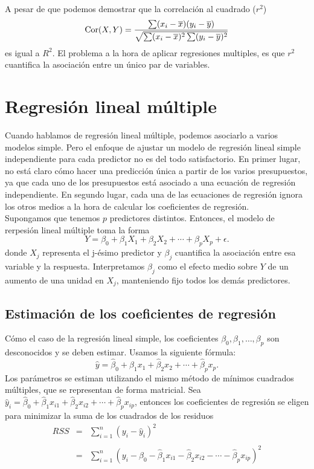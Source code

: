 A pesar de que podemos demostrar que la correlación al cuadrado ($r^2$) 
$$\mathop{\mbox{\normalfont Cor}}\nolimits(X,Y)=\dfrac{\sum(x_i-\overline{x})(y_i-\overline{y})}{\sqrt{\sum(x_i-\overline{x})^2\sum(y_i-\overline{y})^2}}$$
es igual a $R^2$. El problema a la hora de aplicar regresiones multiples, es que $r^2$ cuantifica la asociación entre un único par de variables.


\section{Regresión lineal múltiple}
Cuando hablamos de regresión lineal múltiple, podemos asociarlo a varios modelos simple. Pero el enfoque de ajustar un modelo de regresión lineal simple independiente para cada predictor no es del todo satisfactorio. En primer lugar, no está claro cómo hacer una predicción única a partir de los varios presupuestos, ya que cada uno de los presupuestos está asociado a una ecuación de regresión independiente. En segundo lugar, cada una de las ecuaciones de regresión ignora los otros medios a la hora de calcular los coeficientes de regresión.\\

Supongamos que tenemos $p$ predictores distintos. Entonces, el modelo de rerpesión lineal múltiple toma la forma
$$Y=\beta_0+\beta_1X_1+\beta_2X_2+\cdots+\beta_pX_p+\epsilon.$$
donde $X_j$ representa el j-ésimo predictor y $\beta_j$ cuantifica la asociación entre esa variable y la respuesta. Interpretamos $\beta_j$ como el efecto medio sobre $Y$ de  un aumento de una unidad en $X_j$, manteniendo fijo todos los demás predictores. 

\subsection{Estimación de los coeficientes de regresión}
Cómo el caso de la regresión lineal simple, los coeficientes $\beta_0,\beta_1,\ldots,\beta_p$ son desconocidos y se deben estimar. Usamos la siguiente fórmula: 
$$\hat{y}=\hat{\beta}_0+\hat{\beta}_1x_1+\hat{\beta}_2x_2+\cdots+\hat{\beta}_px_p.$$
Los parámetros se estiman utilizando el mismo método de mínimos cuadrados múltiples, que se representan de forma matricial. Sea $\hat{y}_i=\hat{\beta}_0+\hat{\beta}_1x_{i1}+\hat{\beta}_2x_{i2}+\cdots+\hat{\beta}_px_{ip}$, entonces los coeficientes de regresión se eligen para minimizar la suma de los cuadrados de los residuos
$$
\begin{array}{rcl}
    RSS&=&\displaystyle\sum_{i=1}^n(y_i-\hat{y}_i)^2\\\\
    &=&\displaystyle\sum_{i=1}^n\left(y_i-\hat{\beta}_0-\hat{\beta}_1x_{i1}-\hat{\beta}_2x_{i2}-\cdots-\hat{\beta}_px_{ip}\right)^2
\end{array}
$$

